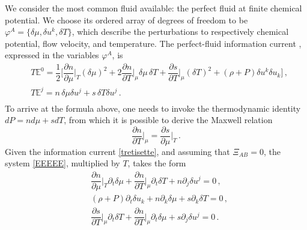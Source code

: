 \documentclass[a4paper, amsfonts, amssymb, amsmath, reprint, showkeys, nofootinbib, twoside, onecolumn,notitlepage]{revtex4-1}
\begin{document}
We consider the most common fluid available: the perfect fluid at finite chemical potential. We choose its ordered array of degrees of freedom to be $\varphi^A=\{\delta \mu, \delta u^k, \delta T \}$, which describe the perturbations to respectively chemical potential, flow velocity, and temperature. The perfect-fluid information current \cite{GavassinoCausality2021}, expressed in the variables $\varphi^A$, is
\begin{equation}\label{tretisette}
\begin{split}
& T\mathbb{E}^0 = \dfrac{1}{2} \bigg[ \dfrac{\partial n}{\partial \mu}\bigg|_T (\delta \mu)^2+ 2\dfrac{\partial n}{\partial T}\bigg|_\mu \delta \mu \, \delta T + \dfrac{\partial s}{\partial T}\bigg|_\mu (\delta T)^2 + (\rho+P)\delta u^k \delta u_k \bigg] \, , \\
& T\mathbb{E}^j = n\, \delta \mu \delta u^j + s \, \delta T \delta u^j \, .\\
\end{split}
\end{equation}
To arrive at the formula above, one needs to invoke the thermodynamic identity $dP=nd\mu +sdT$, from which it is possible to derive the Maxwell relation \cite{landau5}
\begin{equation}\label{Maxwullo}
\dfrac{\partial n}{\partial T}\bigg|_\mu = \dfrac{\partial s}{\partial \mu}\bigg|_T \, .
\end{equation}
Given the information current \eqref{tretisette}, and assuming that $\Xi_{AB}=0$, the system \eqref{EEEEE}, multiplied by $T$, takes the form
\begin{equation}\label{perfucio}
\begin{split}
&  \dfrac{\partial n}{\partial \mu}\bigg|_T \partial_t \delta \mu + \dfrac{\partial n}{\partial T}\bigg|_\mu \partial_t \delta T + n \partial_j \delta u^j =0 \, , \\
& (\rho+P) \partial_t \delta u_k  + n \partial_k \delta \mu +s \partial_k \delta T =0 \, ,\\
& \dfrac{\partial s}{\partial T}\bigg|_\mu \partial_t \delta T + \dfrac{\partial n}{\partial T}\bigg|_\mu \partial_t \delta \mu + s \partial_j \delta u^j =0 \, .\\
\end{split}
\end{equation}
\end{document}
